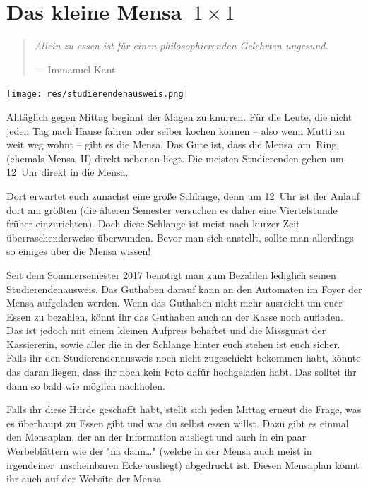 \section[Das kleine Mensa~1~×~1]{\boldmath Das kleine Mensa~${1 \times 1}$}
\begin{multicols*}{2}
\begin{quote}
	\textit{Allein zu essen ist für einen philosophierenden Gelehrten ungesund.}
	
	\hfill--- Immanuel Kant
\end{quote}

\begin{center}
	\texttt{[image: res/studierendenausweis.png]}
\end{center}

Alltäglich gegen Mittag beginnt der Magen zu knurren.
Für die Leute, die nicht jeden Tag nach Hause fahren oder selber kochen können -- also wenn Mutti zu weit weg wohnt -- gibt es die Mensa.
Das Gute ist, dass die Mensa~am~Ring (ehemals Mensa~II) direkt nebenan liegt.
Die meisten Studierenden gehen um 12~Uhr direkt in die Mensa.

Dort erwartet euch zunächst eine große Schlange, denn um 12~Uhr ist der Anlauf dort am größten (die älteren Semester versuchen es daher eine Viertelstunde früher einzurichten).
Doch diese Schlange ist meist nach kurzer Zeit überraschenderweise überwunden.
Bevor man sich anstellt, sollte man allerdings so einiges über die Mensa wissen!

Seit dem Sommersemester 2017 benötigt man zum Bezahlen lediglich seinen Studierendenausweis.
Das Guthaben darauf kann an den Automaten im Foyer der Mensa aufgeladen werden.
Wenn das Guthaben nicht mehr ausreicht um euer Essen zu bezahlen, könnt ihr das Guthaben auch an der Kasse noch aufladen. 
Das ist jedoch mit einem kleinen Aufpreis behaftet und die Missgunst der Kassiererin, sowie aller die in der Schlange hinter euch stehen ist euch sicher.
Falls ihr den Studierendenausweis noch nicht zugeschickt bekommen habt, könnte das daran liegen, dass ihr noch kein Foto dafür hochgeladen habt.
Das solltet ihr dann so bald wie möglich nachholen.

Falls ihr diese Hürde geschafft habt, stellt sich jeden Mittag erneut die Frage, was es überhaupt zu Essen gibt und was du selbst essen willst.
Dazu gibt es einmal den Mensaplan, der an der Information ausliegt und auch in ein paar Werbeblättern wie der "na dann\dots" (welche in der Mensa auch meist in irgendeiner unscheinbaren Ecke ausliegt) abgedruckt ist.
Diesen Mensaplan könnt ihr auch auf der Website der Mensa


\end{multicols*}

